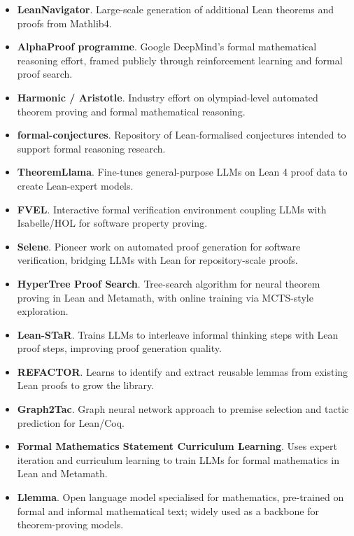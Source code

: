 \documentclass[natbib=false,acmsmall,nonacm,11pt]{acmart}
\begin{document}
\begin{itemize}
\item \textbf{LeanNavigator}. Large-scale generation of additional Lean theorems and proofs from Mathlib4.~\cite{DBLP:journals/corr/abs-2503-04772}
\item \textbf{AlphaProof programme}. Google DeepMind's formal mathematical reasoning effort, framed publicly through reinforcement learning and formal proof search.~\cite{alphaproof_blog_2024,alphaproof_nature_2025}
\item \textbf{Harmonic / Aristotle}. Industry effort on olympiad-level automated theorem proving and formal mathematical reasoning.~\cite{DBLP:journals/corr/abs-2510-01346}
\item \textbf{formal-conjectures}. Repository of Lean-formalised conjectures intended to support formal reasoning research.~\cite{formal_conjectures_repo}
\item \textbf{TheoremLlama}. Fine-tunes general-purpose LLMs on Lean 4 proof data to create Lean-expert models.~\cite{DBLP:journals/corr/abs-2407-03203}
\item \textbf{FVEL}. Interactive formal verification environment coupling LLMs with Isabelle/HOL for software property proving.~\cite{DBLP:journals/corr/abs-2406-14408}
\item \textbf{Selene}. Pioneer work on automated proof generation for software verification, bridging LLMs with Lean for repository-scale proofs.~\cite{DBLP:journals/corr/abs-2401-07663}
\item \textbf{HyperTree Proof Search}. Tree-search algorithm for neural theorem proving in Lean and Metamath, with online training via MCTS-style exploration.~\cite{DBLP:journals/corr/abs-2205-11491}
\item \textbf{Lean-STaR}. Trains LLMs to interleave informal thinking steps with Lean proof steps, improving proof generation quality.~\cite{DBLP:journals/corr/abs-2407-10040}
\item \textbf{REFACTOR}. Learns to identify and extract reusable lemmas from existing Lean proofs to grow the library.~\cite{DBLP:journals/corr/abs-2402-17032}
\item \textbf{Graph2Tac}. Graph neural network approach to premise selection and tactic prediction for Lean/Coq.~\cite{DBLP:journals/corr/abs-2401-02949}
\item \textbf{Formal Mathematics Statement Curriculum Learning}. Uses expert iteration and curriculum learning to train LLMs for formal mathematics in Lean and Metamath.~\cite{DBLP:journals/corr/abs-2202-01344}
\item \textbf{Llemma}. Open language model specialised for mathematics, pre-trained on formal and informal mathematical text; widely used as a backbone for theorem-proving models.~\cite{DBLP:journals/corr/abs-2310-10631}

\end{itemize}
\end{document}
